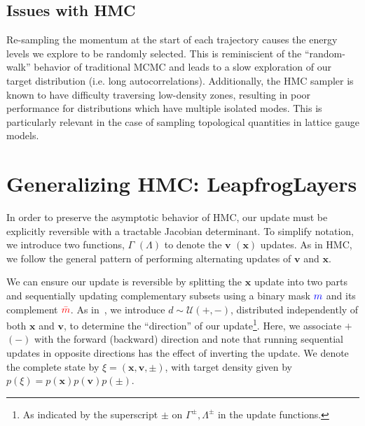 \documentclass[a4paper,11pt]{article}
\newcommand{\x}{\mathbf{x}}
\newcommand{\p}{\mathbf{v}}
\newcommand{\mask}{\textcolor{blue}{{m}}}
\newcommand{\maskbar}{\textcolor{red}{\bar{m}}}
\begin{document}
\subsection{\label{subsec:hmc_issues}Issues with HMC}
%
Re-sampling the momentum at the start of each trajectory causes the energy
levels we explore to be randomly selected.
%
This is reminiscient of the ``random-walk'' behavior of traditional MCMC and
leads to a slow exploration of our target distribution (i.e. long
autocorrelations).
%
Additionally, the HMC sampler is known to have difficulty traversing
low-density zones, resulting in poor performance for distributions which have
multiple isolated modes.
%
This is particularly relevant in the case of sampling topological quantities in
lattice gauge models.
%
%
%
\section{\label{sec:l2hmc}Generalizing HMC: LeapfrogLayers}
%
In order to preserve the asymptotic behavior of HMC, our update must be
explicitly reversible with a tractable Jacobian determinant.
%
To simplify notation, we introduce two functions, \(\Gamma\) \((\Lambda)\) to
denote the \(\p\) \((\x)\) updates.
%
As in HMC, we follow the general pattern of performing alternating updates of
\(\p\) and \(\x\).
%

We can ensure our update is reversible by splitting the \(\x\) update into two
parts and sequentially updating complementary subsets using a binary mask
\(\mask\) and its complement \(\maskbar\).
%
As in~\cite{2017arXiv171109268L,Foreman:2021ixr}, we introduce \(d \sim
\mathcal{U} (+, -)\), distributed independently of both \(\x\) and \(\p\), to
determine the ``direction'' of our update\footnote{%
  As indicated by the superscript \(\pm\) on \(\Gamma^{\pm}, \Lambda^{\pm}\) in
  the update functions.
}.
%
Here, we associate \(+\) \((-)\) with the forward (backward) direction and note
that running sequential updates in opposite directions has the effect of
inverting the update.
%
We denote the complete state by \(\xi = (\x, \p, \pm)\), with target density
given by \(p(\xi) = p(\x) p(\p) p(\pm)\).
%
\end{document}
